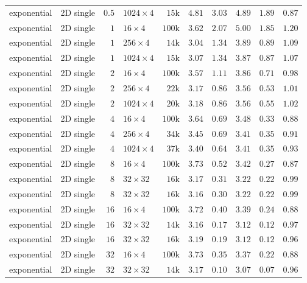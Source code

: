 {\begin{longtable}{llrlrrrrrr}
    exponential & 2D single & $0.5$ & $1024{\times}4$ & $15$k & $4.81$ & $3.03$ & $4.89$ & $1.89$ & $0.87$ \\
    exponential & 2D single & $1$ & $16{\times}4$ & $100$k & $3.62$ & $2.07$ & $5.00$ & $1.85$ & $1.20$ \\
    exponential & 2D single & $1$ & $256{\times}4$ & $14$k & $3.04$ & $1.34$ & $3.89$ & $0.89$ & $1.09$ \\
    exponential & 2D single & $1$ & $1024{\times}4$ & $15$k & $3.07$ & $1.34$ & $3.87$ & $0.87$ & $1.07$ \\
    exponential & 2D single & $2$ & $16{\times}4$ & $100$k & $3.57$ & $1.11$ & $3.86$ & $0.71$ & $0.98$ \\
    exponential & 2D single & $2$ & $256{\times}4$ & $22$k & $3.17$ & $0.86$ & $3.56$ & $0.53$ & $1.01$ \\
    exponential & 2D single & $2$ & $1024{\times}4$ & $20$k & $3.18$ & $0.86$ & $3.56$ & $0.55$ & $1.02$ \\
    exponential & 2D single & $4$ & $16{\times}4$ & $100$k & $3.64$ & $0.69$ & $3.48$ & $0.33$ & $0.88$ \\
    exponential & 2D single & $4$ & $256{\times}4$ & $34$k & $3.45$ & $0.69$ & $3.41$ & $0.35$ & $0.91$ \\
    exponential & 2D single & $4$ & $1024{\times}4$ & $37$k & $3.40$ & $0.64$ & $3.41$ & $0.35$ & $0.93$ \\
    exponential & 2D single & $8$ & $16{\times}4$ & $100$k & $3.73$ & $0.52$ & $3.42$ & $0.27$ & $0.87$ \\
    exponential & 2D single & $8$ & $32{\times}32$ & $16$k & $3.17$ & $0.31$ & $3.22$ & $0.22$ & $0.99$ \\
    exponential & 2D single & $8$ & $32{\times}32$ & $16$k & $3.16$ & $0.30$ & $3.22$ & $0.22$ & $0.99$ \\
    exponential & 2D single & $16$ & $16{\times}4$ & $100$k & $3.72$ & $0.40$ & $3.39$ & $0.24$ & $0.88$ \\
    exponential & 2D single & $16$ & $32{\times}32$ & $14$k & $3.16$ & $0.17$ & $3.12$ & $0.12$ & $0.97$ \\
    exponential & 2D single & $16$ & $32{\times}32$ & $16$k & $3.19$ & $0.19$ & $3.12$ & $0.12$ & $0.96$ \\
    exponential & 2D single & $32$ & $16{\times}4$ & $100$k & $3.73$ & $0.35$ & $3.37$ & $0.22$ & $0.88$ \\
    exponential & 2D single & $32$ & $32{\times}32$ & $14$k & $3.17$ & $0.10$ & $3.07$ & $0.07$ & $0.96$ \\

\end{longtable}}
